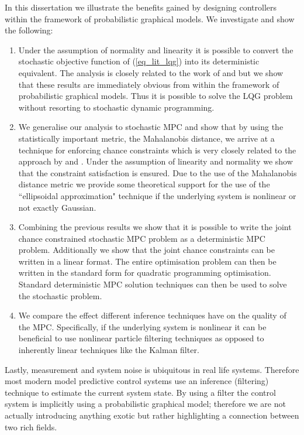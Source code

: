 In this dissertation we illustrate the benefits gained by designing controllers within the framework of probabilistic graphical models. We investigate and show the following:
\begin{enumerate}
\item
Under the assumption of normality and linearity it is possible to convert the stochastic objective function of (\ref{eq_lit_lqg}) into its deterministic equivalent. The analysis is closely related to the work of  \cite{yan1} and \cite{yan2} but we show that these results are immediately obvious from within the framework of probabilistic graphical models. Thus it is possible to solve the LQG problem without resorting to stochastic dynamic programming.
\item
We generalise our analysis to stochastic MPC and show that by using the statistically important metric, the Mahalanobis distance, we arrive at a technique for enforcing chance constraints which is very closely related to the approach by \cite{vanhessem2} and \cite{vanhessem1}. Under the assumption of linearity and normality we show that the constraint satisfaction is ensured. Due to the use of the Mahalanobis distance metric we provide some theoretical support for the use of the ``ellipsoidal approximation" technique if the underlying system is nonlinear or not exactly Gaussian.
\item
Combining the previous results we show that it is possible to write the joint chance constrained stochastic MPC problem as a deterministic MPC problem. Additionally we show that the joint chance constraints can be written in a linear format. The entire optimisation problem can then be written in the standard form for quadratic programming optimisation. Standard deterministic MPC solution techniques can then be used to solve the stochastic problem.
\item
We compare the effect different inference techniques have on the quality of the MPC. Specifically, if the underlying system is nonlinear it can be beneficial to use nonlinear particle filtering techniques as opposed to inherently linear techniques like the Kalman filter.
\end{enumerate}
Lastly, measurement and system noise is ubiquitous in real life systems. Therefore most modern model predictive control systems use an inference (filtering) technique to estimate the current system state. By using a filter the control system is implicitly using a probabilistic graphical model; therefore we are not actually introducing anything exotic but rather highlighting a connection between two rich fields. 

